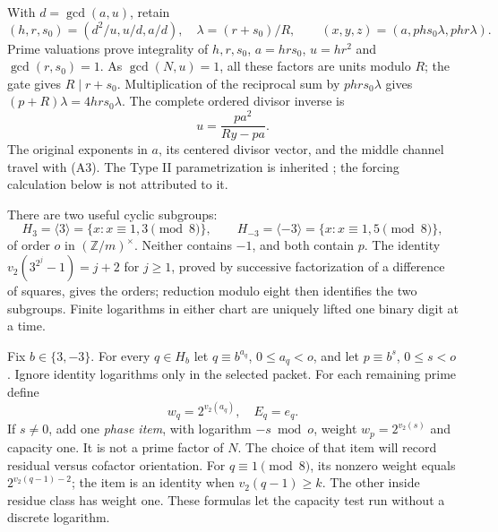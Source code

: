 With $d=\gcd(a,u)$, retain
\[
 (h,r,s_0)=(d^2/u,u/d,a/d),\quad
 \lambda=(r+s_0)/R,\qquad
 (x,y,z)=(a,phs_0\lambda,phr\lambda).                       \tag{A3}
\]
Prime valuations prove integrality of $h,r,s_0$, $a=hrs_0$, $u=hr^2$ and
$\gcd(r,s_0)=1$. As $\gcd(N,u)=1$, all these factors are units modulo $R$;
the gate gives $R\mid r+s_0$. Multiplication of the reciprocal sum by
$phrs_0\lambda$ gives $(p+R)\lambda=4hrs_0\lambda$.
The complete ordered divisor inverse is
\[
 \boxed{u=\frac{pa^2}{Ry-pa}.}                              \tag{A4}
\]
The original exponents in $a$, its centered divisor vector, and the middle
channel travel with (A3). The Type II parametrization is inherited
\cite{ET,TwoBlock}; the forcing calculation below is not attributed to it.

There are two useful cyclic subgroups:
\[
 H_3=\langle3\rangle=\{x:x\equiv1,3\pmod8\},\qquad
 H_{-3}=\langle-3\rangle=\{x:x\equiv1,5\pmod8\},            \tag{A5}
\]
of order $o$ in $(\mathbb Z/m)^\times$. Neither contains $-1$, and both
contain $p$. The identity $v_2(3^{2^j}-1)=j+2$ for $j\ge1$, proved by
successive factorization of a difference of squares, gives the orders;
reduction modulo eight then identifies the two subgroups. Finite logarithms
in either chart are uniquely lifted one binary digit at a time.

Fix $b\in\{3,-3\}$. For every $q\in H_b$ let
$q\equiv b^{a_q}$, $0\le a_q<o$, and let $p\equiv b^s$, $0\le s<o$.
Ignore identity logarithms only in the selected packet. For each remaining
prime define
\[
 w_q=2^{v_2(a_q)},\quad E_q=e_q.
\]
If $s\ne0$, add one \emph{phase item}, with logarithm $-s\bmod o$,
weight $w_p=2^{v_2(s)}$ and capacity one. It is not a prime factor of $N$.
The choice of that item will record residual versus cofactor orientation.
For $q\equiv1\pmod8$, its nonzero weight equals
$2^{v_2(q-1)-2}$; the item is an identity when $v_2(q-1)\ge k$.
The other inside residue class has weight one. These formulas let the
capacity test run without a discrete logarithm.

